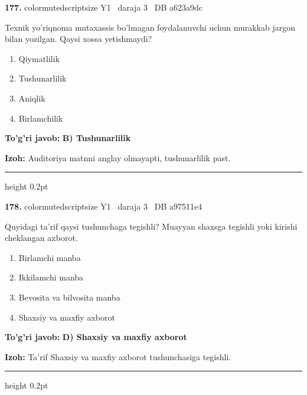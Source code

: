 \documentclass[10pt,a4paper,oneside]{article}
\begin{document}
\noindent\textbf{\color{ink}177.}  {color{muted}scriptsize Y1 \textbullet\ daraja 3 \textbullet\ DB a623a9dc}
\par
Texnik yo'riqnoma mutaxassis bo'lmagan foydalanuvchi uchun murakkab jargon bilan yozilgan. Qaysi xossa yetishmaydi?
\begin{enumerate}[label=\Alph*),leftmargin=9mm]
\item Qiymatlilik
\item Tushunarlilik
\item Aniqlik
\item Birlamchilik
\end{enumerate}
\begin{tcolorbox}[enhanced,breakable,colback=teal!4,colframe=teal!50!black,boxrule=0.5pt,arc=1.1mm,left=3mm,right=3mm,top=1.7mm,bottom=1.7mm,before skip=2mm,after skip=2mm]
\textbf{\color{teal}To'g'ri javob:} \textbf{B) Tushunarlilik}
\par\smallskip
\textbf{Izoh:} Auditoriya matnni anglay olmayapti, tushunarlilik past.
\end{tcolorbox}
\vspace{2mm}\hrule height 0.2pt \vspace{3mm}

\noindent\textbf{\color{ink}178.}  {color{muted}scriptsize Y1 \textbullet\ daraja 3 \textbullet\ DB a97511e4}
\par
Quyidagi ta'rif qaysi tushunchaga tegishli? Muayyan shaxsga tegishli yoki kirishi cheklangan axborot.
\begin{enumerate}[label=\Alph*),leftmargin=9mm]
\item Birlamchi manba
\item Ikkilamchi manba
\item Bevosita va bilvosita manba
\item Shaxsiy va maxfiy axborot
\end{enumerate}
\begin{tcolorbox}[enhanced,breakable,colback=teal!4,colframe=teal!50!black,boxrule=0.5pt,arc=1.1mm,left=3mm,right=3mm,top=1.7mm,bottom=1.7mm,before skip=2mm,after skip=2mm]
\textbf{\color{teal}To'g'ri javob:} \textbf{D) Shaxsiy va maxfiy axborot}
\par\smallskip
\textbf{Izoh:} Ta'rif Shaxsiy va maxfiy axborot tushunchasiga tegishli.
\end{tcolorbox}
\vspace{2mm}\hrule height 0.2pt \vspace{3mm}
\end{document}
